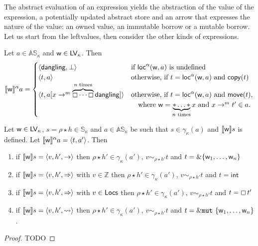 The abstract evaluation of an expression yields the abstraction of the
value of the expression, a potentially updated abstract store
and an arrow that expresses the nature of the value: an owned value, an immutable borrow
or a mutable borrow. Let us start from the leftvalues, then consider the other kinds of
expressions.

\begin{definition}\label{def:abstract_semantics_leftvalues}
  Let $a\in\mathbb{AS}_\kappa$ and $\mathsf{w}\in\Leftvalues_\kappa$. Then
  \[
  \dena[\mathsf{w}]{a}=\begin{cases}
  \langle\mathsf{dangling},\bot\rangle & \text{if $\loca(\mathsf{w},a)$ is undefined}\\
  \langle t, a\rangle & \text{otherwise, if $t=\loca(\mathsf{w},a)$ and $\copytype(t)$}\\
  \langle t, a[x\to^m\overbrace{\boxempty\cdots\boxempty}^{n\text{ times}}\mathsf{dangling}]\rangle & \text{otherwise, if $t=\loca(\mathsf{w},a)$ and $\movetype(t)$,}\\
  & \quad\text{where $\mathsf{w}=\underbrace{*\ldots*}_{n\text{ times}}x$ and $x\to^mt'\in a$.}
  \end{cases}
  \]
\end{definition}

\begin{proposition}
  \label{prop:abstract_leftvalues_correctness}
  Let $\mathsf{w}\in\Leftvalues_\kappa$, $s=\rho\star h\in\mathbb{S}_\kappa$
  and $a\in\mathbb{AS}_\kappa$ be
  such that $s\in\gamma_\kappa(a)$ and
  $\den[\mathsf{w}]{s}$ is defined. Let
  $\dena[\mathsf{w}]{a}=\langle t,a'\rangle$. Then
  \begin{enumerate}
  \item if $\den[\mathsf{w}]{s}=\langle v,h',\to\rangle$
    then $\rho\star h'\in\gamma_\kappa(a')$, $v\sim_{\rho\star h'}t$
    and $t=\borrow\{\mathsf{w}_1,\ldots,\mathsf{w}_n\}$
  \item if $\den[\mathsf{w}]{s}=\langle v,h',\Rightarrow\rangle$ with $v\in\mathbb{Z}$
    then $\rho\star h'\in\gamma_\kappa(a')$, $v\sim_{\rho\star h'}t$
    and $t=\mathsf{int}$
  \item if $\den[\mathsf{w}]{s}=\langle v,h',\Rightarrow\rangle$ with $v\in\Locs$
    then $\rho\star h'\in\gamma_\kappa(a')$, $v\sim_{\rho\star h'}t$
    and $t=\boxtype{t'}$
  \item if $\den[\mathsf{w}]{s}=\langle v,h',\leadsto\rangle$
    then $\rho\star h'\in\gamma_\kappa(a')$, $v\sim_{\rho\star h'}t$
    and $t=\mutborrow\{\mathsf{w}_1,\ldots,\mathsf{w}_n\}$.
  \end{enumerate}
\end{proposition}
\begin{proof}
  TODO
\end{proof}
